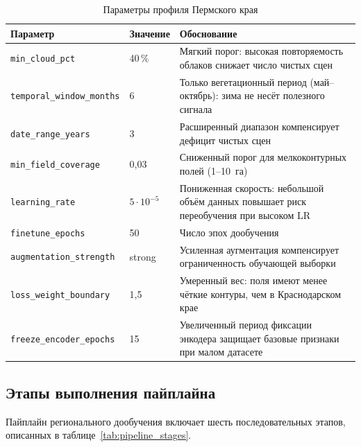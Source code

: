 \documentclass[14pt,a4paper]{extarticle}
\newcommand{\tbl}[1]{\texttt{#1}}  %
\begin{document}
\begin{table}[h!]
\caption{Параметры профиля Пермского края}
\label{tab:perm_profile}
\begin{tabularx}{\textwidth}{L{50mm}L{24mm}X}
\toprule
\textbf{Параметр} & \textbf{Значение} & \textbf{Обоснование} \\
\midrule
\tbl{min\_cloud\_pct}         & 40\,\%      & Мягкий порог: высокая повторяемость облаков снижает число чистых сцен \\
\tbl{temporal\_window\_months}& 6           & Только вегетационный период (май–октябрь): зима не несёт полезного сигнала \\
\tbl{date\_range\_years}      & 3           & Расширенный диапазон компенсирует дефицит чистых сцен \\
\tbl{min\_field\_coverage}    & 0,03        & Сниженный порог для мелкоконтурных полей (1--10~га) \\
\tbl{learning\_rate}          & $5\cdot10^{-5}$ & Пониженная скорость: небольшой объём данных повышает риск переобучения при высоком LR \\
\tbl{finetune\_epochs}        & 50          & Число эпох дообучения \\
\tbl{augmentation\_strength}  & strong      & Усиленная аугментация компенсирует ограниченность обучающей выборки \\
\tbl{loss\_weight\_boundary}  & 1,5         & Умеренный вес: поля имеют менее чёткие контуры, чем в Краснодарском крае \\
\tbl{freeze\_encoder\_epochs} & 15          & Увеличенный период фиксации энкодера защищает базовые признаки при малом датасете \\
\bottomrule
\end{tabularx}
\end{table}

\subsection{Этапы выполнения пайплайна}

Пайплайн регионального дообучения включает шесть последовательных этапов,
описанных в таблице~\ref{tab:pipeline_stages}.
\end{document}
